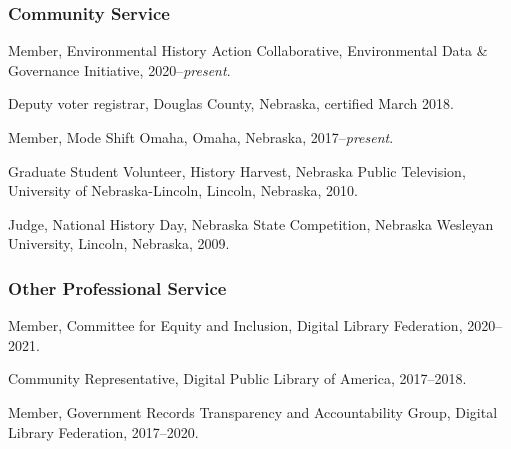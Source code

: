 \subsubsection{Community Service}\label{community-service}

Member, Environmental History Action Collaborative, Environmental Data
\& Governance Initiative, 2020--\emph{present}.

Deputy voter registrar, Douglas County, Nebraska, certified March 2018.

Member, Mode Shift Omaha, Omaha, Nebraska, 2017--\emph{present}.

Graduate Student Volunteer, History Harvest, Nebraska Public Television,
University of Nebraska-Lincoln, Lincoln, Nebraska, 2010.

Judge, National History Day, Nebraska State Competition, Nebraska
Wesleyan University, Lincoln, Nebraska, 2009.

\subsubsection{Other Professional
Service}\label{other-professional-service}

Member, Committee for Equity and Inclusion, Digital Library Federation,
2020--2021.

Community Representative, Digital Public Library of America, 2017--2018.

Member, Government Records Transparency and Accountability Group,
Digital Library Federation, 2017--2020.
